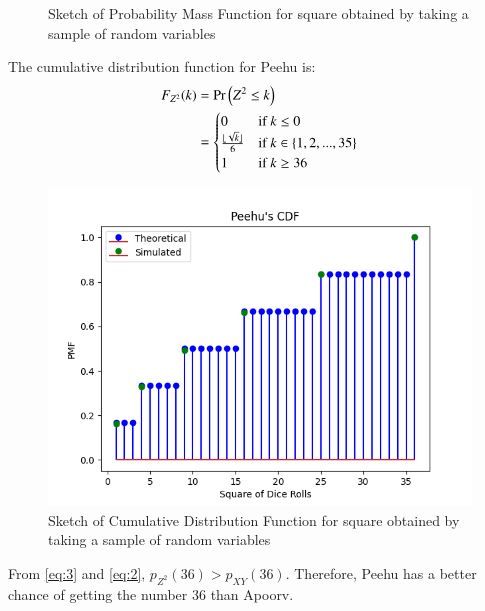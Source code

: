 \documentclass[journal,12pt,twocolumn]{IEEEtran}
\theoremstyle{remark}
\begin{document}
\begin{enumerate}
\begin{figure}[h!]
        \caption{Sketch of Probability Mass Function for square obtained by taking a sample of random variables}
    \end{figure}
    The cumulative distribution function for Peehu is:
    \begin{align}
        F_{Z^2}(k) &= \Pr\left(Z^2 \leq k\right)\\
        &= 
        \begin{cases}
            0 & \text{if }k \leq 0\\
            \frac{\lfloor\sqrt{k}\rfloor}{6} & \text{if }k \in \{1, 2, ..., 35\}\\
            1 & \text{if }k \geq 36
        \end{cases}
    \end{align}
    \begin{figure}[h!]
        \includegraphics[width=0.4\columnwidth]{exemplar/10/13/2/7/plots/Peehu_CDF.png}
        \caption{Sketch of Cumulative Distribution Function for square obtained by taking a sample of random variables}
    \end{figure}
\end{enumerate}
From \eqref{eq:3} and \eqref{eq:2}, $p_{Z^2}(36) > p_{XY}(36)$. Therefore, Peehu has a better chance of getting the number 36 than Apoorv.
\end{document}
